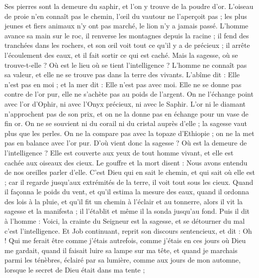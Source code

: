 \begin{multicols}{2}
Ses pierres sont la demeure du saphir, et l'on y trouve de la poudre d'or.
L'oiseau de proie n'en connaît pas le chemin, l'œil du vautour ne l'aperçoit pas ;
les plus jeunes et fiers animaux n'y ont pas marché, le lion n'y a jamais passé.
L'homme avance sa main sur le roc, il renverse les montagnes depuis la racine ;
il fend des tranchées dans les rochers, et son œil voit tout ce qu'il y a de précieux ;
il arrête l'écoulement des eaux, et il fait sortir ce qui est caché.
Mais la sagesse, où se trouve-t-elle ? Où est le lieu où se tient l'intelligence ?
L'homme ne connaît pas sa valeur, et elle ne se trouve pas dans la terre des vivants.
L'abîme dit : Elle n'est pas en moi ; et la mer dit : Elle n'est pas avec moi.
Elle ne se donne pas contre de l'or pur, elle ne s'achète pas au poids de l'argent.
On ne l'échange point avec l'or d'Ophir, ni avec l'Onyx précieux, ni avec le Saphir.
L'or ni le diamant n'approchent pas de son prix, et on ne la donne pas en échange pour un vase de fin or.
On ne se souvient ni du corail ni du cristal auprès d'elle ; la sagesse vaut plus que les perles.
On ne la compare pas avec la topaze d'Ethiopie ; on ne la met pas en balance avec l'or pur.
D'où vient donc la sagesse ? Où est la demeure de l'intelligence ?
Elle est couverte aux yeux de tout homme vivant, et elle est cachée aux oiseaux des cieux.
Le gouffre et la mort disent : Nous avons entendu de nos oreilles parler d'elle.
C'est Dieu qui en sait le chemin, et qui sait où elle est ;
car il regarde jusqu'aux extrémités de la terre, il voit tout sous les cieux.
Quand il façonna le poids du vent, et qu'il estima la mesure des eaux,
quand il ordonna des lois à la pluie, et qu'il fit un chemin à l'éclair et au tonnerre,
alors il vit la sagesse et la manifesta ; il l'établit et même il la sonda jusqu'au fond.
Puis il dit à l'homme : Voici, la crainte du Seigneur est la sagesse, et se détourner du mal c'est l'intelligence.
\VerseOne{} Et Job continuant, reprit son discours sentencieux, et dit :
Oh ! Qui me ferait être comme j'étais autrefois, comme j'étais en ces jours où Dieu me gardait,
quand il faisait luire sa lampe sur ma tête, et quand je marchais parmi les ténèbres, éclairé par sa lumière,
comme aux jours de mon automne, lorsque le secret de Dieu était dans ma tente ;

\end{multicols}
